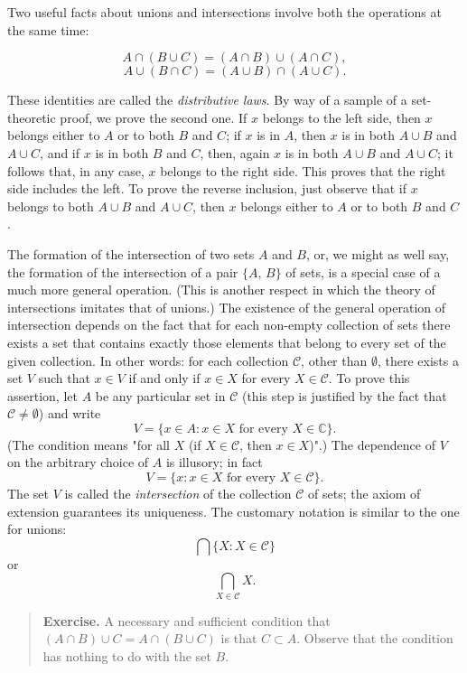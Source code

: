 Two useful facts about unions and intersections involve both the operations at the same time:

\[
	A \cap (B \cup C) = (A \cap B) \cup (A \cap C),
\]
\[
	A \cup (B \cap C) = (A \cup B) \cap (A \cup C).
\]

These identities are called the \textit{distributive laws}. By way of a sample of a set-theoretic proof, we prove the second one. If $x$ belongs to the left side, then $x$ belongs either to $A$ or to both $B$ and $C$; if $x$ is in $A$, then $x$ is in both $A \cup B$ and $A \cup C$, and if $x$ is in both $B$ and $C$, then, again $x$ is in both $A \cup B$ and $A \cup C$; it follows that, in any case, $x$ belongs to the right side. This proves that the right side includes the left. To prove the reverse inclusion, just observe that if $x$ belongs to both $A \cup B$ and $A \cup C$, then $x$ belongs either to $A$ or to both $B$ and $C$.

The formation of the intersection of two sets $A$ and $B$, or, we might as well say, the formation of the intersection of a pair $\{A, \, B\}$ of sets, is a special case of a much more general operation. (This is another respect in which the theory of intersections imitates that of unions.) The existence of the general operation of intersection depends on the fact that for each non-empty collection of sets there exists a set that contains exactly those elements that belong to every set of the given collection. In other words: for each collection $\mathcal{C}$, other than $\emptyset$, there exists a set $V$ such that $x \in V$ if and only if $x \in X$ for every $X \in \mathcal{C}$. To prove this assertion, let $A$ be any particular set in $\mathcal{C}$ (this step is justified by the fact that $\mathcal{C} \neq \emptyset$) and write
\[
	V = \{ x \in A : x \in X \text{ for every } X \in \mathbb{C}\}.
\]
(The condition means "for all $X$ (if $X \in \mathcal{C}$, then $x \in X$)".) The dependence of $V$ on the arbitrary choice of $A$ is illusory; in fact
\[
	V = \{x : x \in X \text{ for every } X \in \mathcal{C}\}.
\]
The set $V$ is called the \textit{intersection} of the collection $\mathcal{C}$ of sets; the axiom of extension guarantees its uniqueness. The customary notation is similar to the one for unions:
\[
	\bigcap \{X : X \in \mathcal{C}\}
\]
or
\[
	\bigcap_{X \in \mathcal{C}} X.
\]
\begin{quote}
	\textbf{Exercise.} A necessary and sufficient condition that $(A \cap B) \cup C = A \cap (B \cup C)$ is that $C \subset A$. Observe that the condition has nothing to do with the set $B$.
\end{quote}

